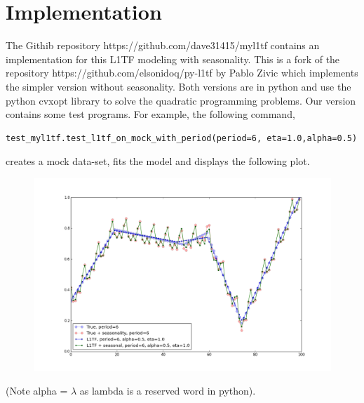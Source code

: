\documentclass{article}
\begin{document}
\section{Implementation}
The Githib repository https://github.com/dave31415/myl1tf contains an implementation for this
L1TF modeling with seasonality. This is a fork of the repository
https://github.com/elsonidoq/py-l1tf by Pablo Zivic which implements the
simpler version without seasonality. Both versions are in python and
use the python cvxopt library to solve the quadratic programming problems. Our
version contains some test programs. For example, the following command,
\begin{verbatim}
test_myl1tf.test_l1tf_on_mock_with_period(period=6, eta=1.0,alpha=0.5)
\end{verbatim}
creates a mock data-set, fits the model and displays the following plot.
\begin{figure}
\centering
\includegraphics[width=500pt]{example.png}
\end{figure}
(Note alpha = $\lambda$ as lambda is a reserved word in python).
\end{document}
